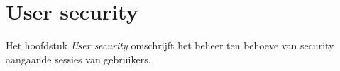 
\section{User security}\label{usersecurity}

Het hoofdstuk \emph{User security} omschrijft het beheer ten behoeve van security aangaande sessies van gebruikers.



